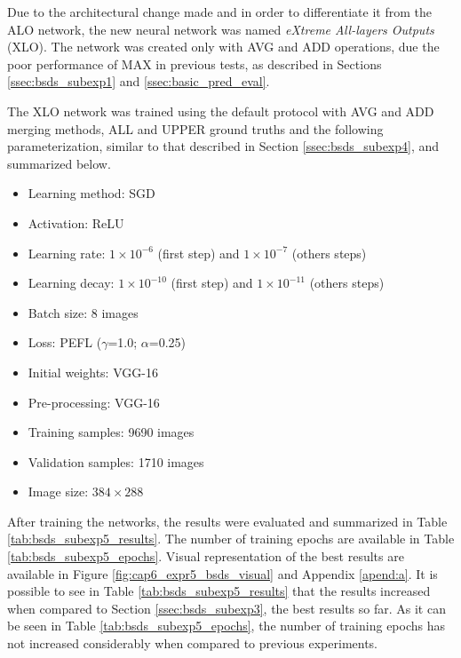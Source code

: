 Due to the architectural change made and in order to differentiate it from the ALO network, the new neural network was named \textit{eXtreme All-layers Outputs}  (XLO).
The network was created only with AVG and ADD operations, due the poor performance of MAX in previous tests, as described in Sections \ref{ssec:bsds_subexp1} and \ref{ssec:basic_pred_eval}.

The XLO network was trained using the default protocol with AVG and ADD merging methods, ALL and UPPER ground truths and the following parameterization, similar to that described in Section \ref{ssec:bsds_subexp4}, and summarized below.

\begin{itemize}
  \item Learning method: SGD
  \item Activation: ReLU
  \item Learning rate: $1 \times 10^{-6}$ (first step) and $1 \times 10^{-7}$ (others steps)
  \item Learning decay: $1 \times 10^{-10}$ (first step) and $1 \times 10^{-11}$ (others steps)
  \item Batch size: 8 images
  \item Loss: PEFL ($\gamma$=1.0; $\alpha$=0.25)
  \item Initial weights: VGG-16
  \item Pre-processing: VGG-16
  \item Training samples: 9690 images 
  \item Validation samples: 1710 images
  \item Image size: $384 \times 288$
\end{itemize}

After training the networks, the results were evaluated and summarized in Table \ref{tab:bsds_subexp5_results}.
The number of training epochs are available in Table \ref{tab:bsds_subexp5_epochs}.
Visual representation of the best results are available in Figure \ref{fig:cap6_expr5_bsds_visual} and Appendix \ref{apend:a}.
It is possible to see in Table \ref{tab:bsds_subexp5_results} that the results increased when compared to Section \ref{ssec:bsds_subexp3}, the best results so far.
As it can be seen in Table \ref{tab:bsds_subexp5_epochs}, the number of training epochs has not increased considerably when compared to previous experiments.

